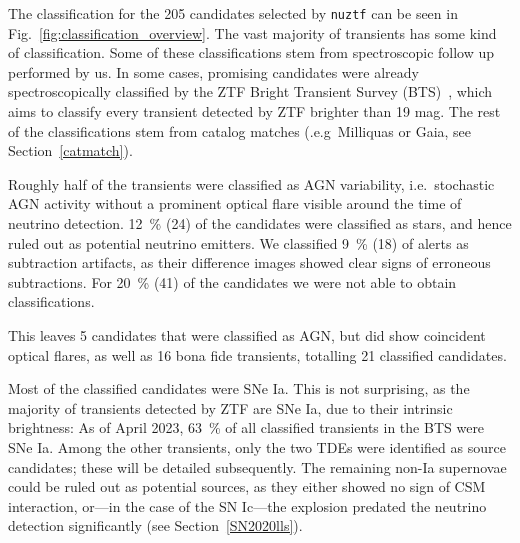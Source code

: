 The classification for the 205 candidates selected by \texttt{nuztf} can be seen in Fig.~\ref{fig:classification_overview}. The vast majority of transients has some kind of classification. Some of these classifications stem from spectroscopic follow up performed by us. In some cases, promising candidates were already spectroscopically classified by the ZTF Bright Transient Survey (BTS)~, which aims to classify every transient detected by ZTF brighter than 19 mag. The rest of the classifications stem from catalog matches (.e.g\ Milliquas or Gaia, see Section~\ref{catmatch}).

Roughly half of the transients were classified as AGN variability, i.e.\ stochastic AGN activity without a prominent optical flare visible around the time of neutrino detection. \SI{12}{\percent} (24) of the candidates were classified as stars, and hence ruled out as potential neutrino emitters. We classified \SI{9}{\percent} (18) of alerts as subtraction artifacts, as their difference images showed clear signs of erroneous subtractions. For \SI{20}{\percent} (41) of the candidates we were not able to obtain classifications.

This leaves 5 candidates that were classified as AGN, but did show coincident optical flares, as well as 16 bona fide transients, totalling 21 classified candidates.

Most of the classified candidates were SNe Ia. This is not surprising, as the majority of transients detected by ZTF are SNe Ia, due to their intrinsic brightness: As of April 2023, \SI{63}{\percent} of all classified transients in the BTS were SNe Ia. Among the other transients, only the two TDEs were identified as source candidates; these will be detailed subsequently. The remaining non-Ia supernovae could be ruled out as potential sources, as they either showed no sign of CSM interaction, or---in the case of the SN Ic---the explosion predated the neutrino detection significantly (see Section~\ref{SN2020lls}).

